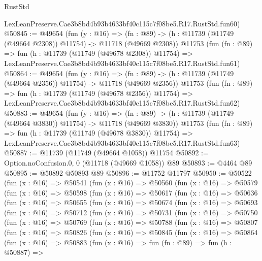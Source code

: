 \begin{lexlean}{RustStd}
\begin{coremodule}
    LexLeanPreserve.Cae3b8bd4b93b4633bf40c115c7f08be5.R17.RustStd.fun60)
@50845 := @49654
    (fun (y : @16) =>
    (fn : @89) -> (h : @11739 (@11749 (@49664 @2308)) @11754) -> @11718 (@49669 @2308))
    @11753
    (fun (fn : @89) =>
    fun (h : @11739 (@11749 (@49678 @2308)) @11754) =>
    LexLeanPreserve.Cae3b8bd4b93b4633bf40c115c7f08be5.R17.RustStd.fun61)
@50864 := @49654
    (fun (y : @16) =>
    (fn : @89) -> (h : @11739 (@11749 (@49664 @2356)) @11754) -> @11718 (@49669 @2356))
    @11753
    (fun (fn : @89) =>
    fun (h : @11739 (@11749 (@49678 @2356)) @11754) =>
    LexLeanPreserve.Cae3b8bd4b93b4633bf40c115c7f08be5.R17.RustStd.fun62)
@50883 := @49654
    (fun (y : @16) =>
    (fn : @89) -> (h : @11739 (@11749 (@49664 @3830)) @11754) -> @11718 (@49669 @3830))
    @11753
    (fun (fn : @89) =>
    fun (h : @11739 (@11749 (@49678 @3830)) @11754) =>
    LexLeanPreserve.Cae3b8bd4b93b4633bf40c115c7f08be5.R17.RustStd.fun63)
@50887 := @11739 (@11749 (@49664 @1058)) @11754
@50892 := Option.noConfusion.{0, 0} (@11718 (@49669 @1058)) @89
@50893 := @4464 @89
@50895 := @50892 @50893 @89
@50896 := @11752 @11797
@50950 := @50522
    (fun (x : @16) =>
    @50541
      (fun (x : @16) =>
      @50560
        (fun (x : @16) =>
        @50579
          (fun (x : @16) =>
          @50598
            (fun (x : @16) =>
            @50617
              (fun (x : @16) =>
              @50636
                (fun (x : @16) =>
                @50655
                  (fun (x : @16) =>
                  @50674
                    (fun (x : @16) =>
                    @50693
                      (fun (x : @16) =>
                      @50712
                        (fun (x : @16) =>
                        @50731
                          (fun (x : @16) =>
                          @50750
                            (fun (x : @16) =>
                            @50769
                              (fun (x : @16) =>
                              @50788
                                (fun (x : @16) =>
                                @50807
                                  (fun (x : @16) =>
                                  @50826
                                    (fun (x : @16) =>
                                    @50845
                                      (fun (x : @16) =>
                                      @50864
                                        (fun (x : @16) =>
                                        @50883
                                          (fun (x : @16) =>
                                          fun (fn : @89) =>
                                          fun (h : @50887) =>

\end{coremodule}
\end{lexlean}

